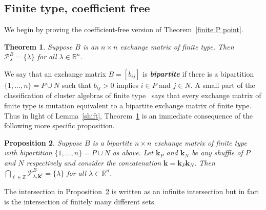 \documentclass{amsart}
\newtheorem{proposition}{Proposition}[section]
\newtheorem{theorem}[proposition]{Theorem}
\theoremstyle{definition}
\theoremstyle{remark}
\numberwithin{equation}{section}
\newcommand{\newword}[1]{\textbf{\emph{#1}}}
\newcommand{\integers}{\mathbb Z}
\newcommand{\reals}{\mathbb R}
\newcommand{\set}[1]{{\lbrace #1 \rbrace}}
\newcommand{\0}{{\mathbf{0}}}
\newcommand{\kk}{{\boldsymbol{k}}}
\renewcommand{\P}{\mathcal{P}}
\begin{document}
\subsection{Finite type, coefficient free}
We begin by proving the coefficient-free version of Theorem~\ref{finite P point}.

\begin{theorem}\label{finite P point no}  
Suppose $B$ is an $n\times n$ exchange matrix of finite type.
Then ${\P^B_\lambda=\set{\lambda}}$ for all $\lambda\in\reals^n$.
\end{theorem}

We say that an exchange matrix $B=[b_{ij}]$ is \newword{bipartite} if there is a bipartition $\set{1,\ldots,n}=P\cup N$ such that $b_{ij}>0$ implies $i\in P$ and $j\in N$.
A small part of the classification of cluster algebras of finite type~\cite{ca2} says that every exchange matrix of finite type is mutation equivalent to a bipartite exchange matrix of finite type.
Thus in light of Lemma~\ref{shift}, Theorem~\ref{finite P point no} is an immediate consequence of the following more specific proposition.


\begin{proposition}\label{finite P point bip}
  Suppose $B$ is a bipartite $n\times n$ exchange matrix of finite type with bipartition $\set{1,\ldots,n}=P\cup N$ as above.
  Let $\kk_P$ and $\kk_N$ be any shuffle of $P$ and $N$ respectively and consider the concatenation $\kk=\kk_P \kk_N$.
  Then $\bigcap_{\ell\in\integers}\P^B_{\lambda,\kk^\ell}=\set{\lambda}$ for all $\lambda\in\reals^n$.
\end{proposition}

The intersection in Proposition~\ref{finite P point bip} is written as an infinite intersection but in fact is the intersection of finitely many different sets.
\end{document}
